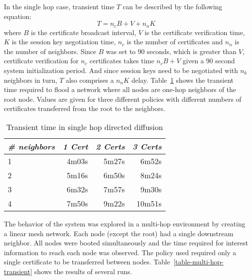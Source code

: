 In the single hop case, transient time $T$ can be described by the following equation:
\begin{displaymath}
T = n_c B + V + n_n K
\end{displaymath}
where $B$ is the certificate broadcast interval, $V$ is the certificate verification time, $K$
is the session key negotiation time, $n_c$ is the number of certificates and $n_n$ is the number
of neighbors. Since $B$ was set to 90 seconds, which is greater than $V$, certificate
verification for $n_c$ certificates takes time $n_c B + V$ given a 90 second system
initialization period. And since session keys need to be negotiated with $n_k$ neighbors in
turn, $T$ also comprises a $n_nK$ delay. Table~\ref{table-one-hop-transient} shows the transient
time required to flood a network where all nodes are one-hop neighbors of the root node. Values
are given for three different policies with different numbers of certificates transferred from
the root to the neighbors.

\begin{table}[tbhp]
  \newcommand\T{\rule{0pt}{2.1ex}}
  \centering
  \caption{Transient time in single hop directed diffusion}
  {
  \begin{tabular}{|l|r|r|r|} \hline
    \textit{\# neighbors} \T & \textit{1 Cert }
                             & \textit{2 Certs}
                             & \textit{3 Certs} \\ \hline \hline

    1 \T &  4m03s & 5m27s &  6m52s \\ \hline
    2 \T &  5m16s & 6m50s &  8m24s \\ \hline
    3 \T &  6m32s & 7m57s &  9m30s \\ \hline
    4 \T &  7m50s & 9m22s & 10m51s \\ \hline
  \end{tabular}
  }
  \label{table-one-hop-transient}
\end{table}

The behavior of the system was explored in a multi-hop environment by creating a linear mesh
network. Each node (except the root) had a single downstream neighbor. All nodes were booted
simultaneously and the time required for interest information to reach each node was observed.
The policy used required only a single certificate to be transferred between nodes.
Table~\ref{table-multi-hop-transient} shows the results of several runs.

